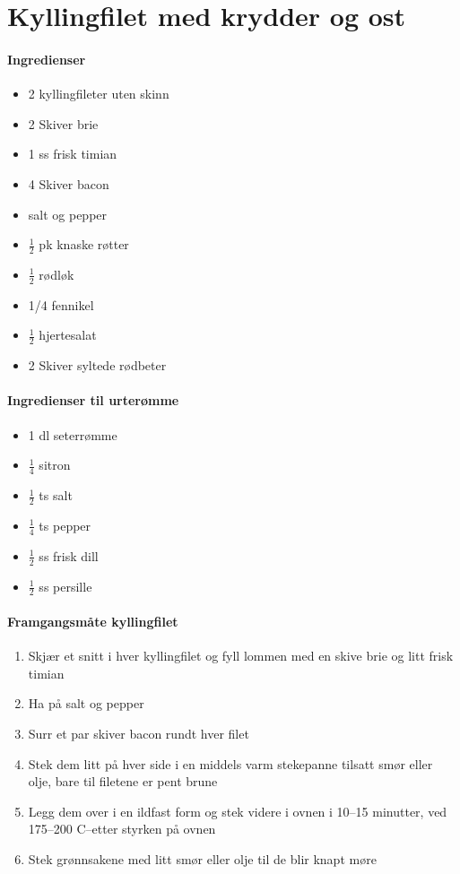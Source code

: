 \section{﻿Kyllingfilet med krydder og ost}


\paragraph{Ingredienser}
\begin{itemize}[noitemsep]
	\item 2 kyllingfileter uten skinn
	\item 2 Skiver  brie
	\item 1 ss frisk timian
	\item 4 Skiver bacon
	\item salt og pepper
	\item $\frac{1}{2}$  pk knaske røtter
	\item $\frac{1}{2}$  rødløk
	\item 1/4 fennikel
	\item $\frac{1}{2}$  hjertesalat
	\item 2 Skiver syltede rødbeter
\end{itemize}

\paragraph{Ingredienser til urterømme}
\begin{itemize}[noitemsep]
	\item 1 dl seterrømme
	\item $\frac{1}{4}$  sitron
	\item $\frac{1}{2}$  ts salt
	\item $\frac{1}{4}$  ts pepper
	\item $\frac{1}{2}$  ss frisk dill
	\item $\frac{1}{2}$  ss persille
\end{itemize}

\paragraph{Framgangsmåte kyllingfilet}
\begin{enumerate}[noitemsep]
	\item Skjær et snitt i hver kyllingfilet og fyll lommen med en skive brie og litt frisk timian
	\item Ha på salt og pepper
	\item Surr et par skiver bacon rundt hver filet
	\item Stek dem litt på hver side i en middels varm stekepanne tilsatt smør eller olje, bare til filetene er pent brune
	\item Legg dem over i en ildfast form og stek videre i ovnen i 10--15 minutter, ved 175--200 \degree C--etter styrken på ovnen
	\item Stek grønnsakene med litt smør eller olje til de blir knapt møre
\end{enumerate}



